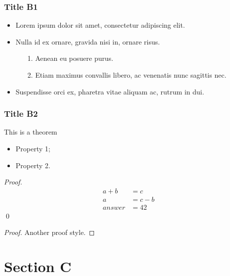 \documentclass[c]{beamer}
\begin{document}
\begin{frame}
\frametitle{Title B1}

\begin{itemize}
\addtolength{\itemsep}{.2cm}
\item Lorem ipsum dolor sit amet, consectetur adipiscing elit.
\item Nulla id ex ornare, gravida nisi in, ornare risus.
  \begin{itemize}
    \addtolength{\itemsep}{.1cm}
  \item[1.] Aenean eu posuere purus.
  \item[2.] Etiam maximus convallis libero, ac venenatis nunc sagittis nec.
  \end{itemize}
\item Suspendisse orci ex, pharetra vitae aliquam ac, rutrum in dui.
\end{itemize}

\end{frame}


\begin{frame}
\frametitle{Title B2}

\begin{theorem}[Th. Name]
\label{thlabel} This is a theorem
\begin{itemize}
\item Property 1;
\item Property 2.
\end{itemize}
\end{theorem}

\pause

\textit{Proof. }
\begin{align}
    a + b & = c \\
    a & = c - b \\
    answer & = 42
\end{align}
\qed

\pause

\begin{proof}
Another proof style.
\end{proof}

\end{frame}

\section{Section C}
\end{document}
